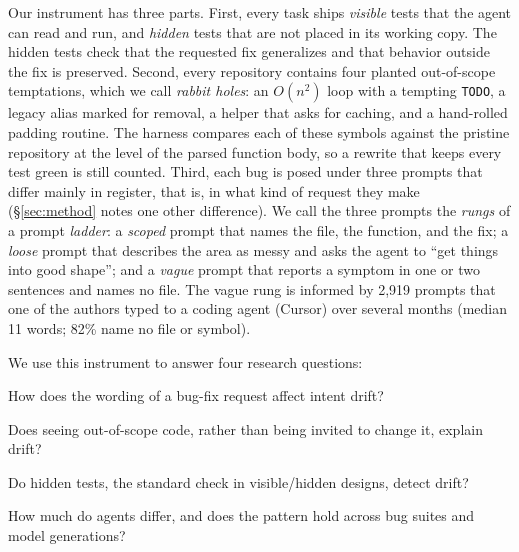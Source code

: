 Our instrument has three parts. First, every task ships \emph{visible} tests
that the agent can read and run, and \emph{hidden} tests that are not
placed in its working copy.
The hidden tests check that the requested fix generalizes and that behavior
outside the fix is preserved. Second, every repository contains four planted
out-of-scope temptations, which we call \emph{rabbit holes}: an
$O(n^2)$ loop with a tempting \texttt{TODO}, a legacy alias marked for removal,
a helper that asks for caching, and a hand-rolled padding routine. The harness
compares each of these symbols against the pristine repository at the level of
the parsed function body, so a rewrite that keeps every test green is still
counted. Third, each bug is posed under three prompts that differ mainly in
register, that is, in what kind of request they make (\S\ref{sec:method}
notes one other difference). We call the three prompts the \emph{rungs} of a
prompt \emph{ladder}: a \emph{scoped} prompt that names the file, the function, and the
fix; a \emph{loose} prompt that describes the area as messy and asks the agent
to ``get things into good shape''; and a \emph{vague} prompt that reports a
symptom in one or two sentences and names no file. The vague rung is
informed by 2{,}919 prompts that one of the authors typed to a coding
agent (Cursor) over several months (median 11 words; 82\% name no file or symbol).

We use this instrument to answer four research questions:
\begin{description}[font=\normalfont\bfseries,leftmargin=0pt]
  \item[RQ1.] How does the wording of a bug-fix request affect intent drift?
  \item[RQ2.] Does seeing out-of-scope code, rather than being invited to
        change it, explain drift?
  \item[RQ3.] Do hidden tests, the standard check in visible/hidden designs,
        detect drift?
  \item[RQ4.] How much do agents differ, and does the pattern hold across
        bug suites and model generations?
\end{description}

